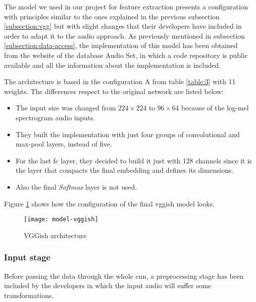 	The model we used in our project for feature extraction presents a configuration with principles similar to the ones explained in the previous subsection \ref{subsection:vgg} but with slight changes that their developers have included in order to adapt it to the audio approach. As previously mentioned in subsection \ref{subsection:data-access}, the implementation of this model has been obtained from the website of the database Audio Set, in which a code repository is public available \cite{Ellis2017} and all the information about the implementation is included.
	
	The architecture is based in the configuration A from table \ref{table:3} with 11 weights. The differences respect to the original network are listed below: 
	\begin{itemize}
		\item The input size was changed from $224 \times 224$ to $96 \times 64$ because of the log-mel spectrogram audio inputs.
		\item They built the implementation with just four groups of convolutional and max-pool layers, instead of five.
		\item For the last \acrshort{fc} layer, they decided to build it just with 128 channels since it is the layer that compacts the final embedding and defines its dimensions.
		\item Also the final \textit{Softmax} layer is not used.
	\end{itemize}
	Figure \ref{fig:mesh2} shows how the configuration of the final \acrshort{vgg}ish model looks.
	
	\begin{figure}
		\centering
		\captionsetup{justification=centering}
		\texttt{[image: model-vggish]}
		\caption{VGGish architecture}
		\label{fig:mesh2}
	\end{figure}

\subsubsection*{Input stage}

	Before passing the data through the whole \acrshort{cnn}, a preprocessing stage has been included by the developers in which the input audio will suffer some transformations. 

